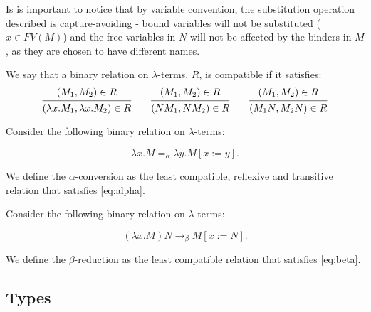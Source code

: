 \begin{remark}
  Is is important to notice that by variable convention, the substitution operation described is capture-avoiding - bound variables will not be substituted ($x \in FV(M)$) and the free variables in $N$ will not be affected by the binders in $M$, as they are chosen to have different names. 
\end{remark}

\begin{definition}
  We say that a binary relation on $\lambda$-terms, $R$, is compatible if it satisfies:
  \[
    \begin{prooftree}
      \hypo{ (M_1, M_2) \in R }
      \infer1{ (\lambda x . M_1, \lambda x . M_2) \in R } 
    \end{prooftree}
    \qquad
    \begin{prooftree}
      \hypo{ (M_1, M_2) \in R }
      \infer1{ (N M_1, N M_2) \in R } 
    \end{prooftree}
    \qquad
    \begin{prooftree}
      \hypo{ (M_1, M_2) \in R }
      \infer1{ (M_1 N, M_2 N) \in R } 
    \end{prooftree}
  \]
\end{definition}

\begin{definition}
  Consider the following binary relation on $\lambda$-terms:
  
  \[
    \lambda x . M =_\alpha \lambda y . M[x := y]. 
    \label{eq:alpha} \tag{$\alpha$}
  \]
  
  We define the $\alpha$-conversion as the least compatible, reflexive and transitive relation that satisfies \eqref{eq:alpha}.
\end{definition}

\begin{definition}
  Consider the following binary relation on $\lambda$-terms:
  
  \[
    (\lambda x . M) N \to_\beta M[x := N]. \label{eq:beta} \tag{$\beta$}
  \]
  
  We define the $\beta$-reduction as the least compatible relation that satisfies \eqref{eq:beta}.
\end{definition}


\subsection{Types}

